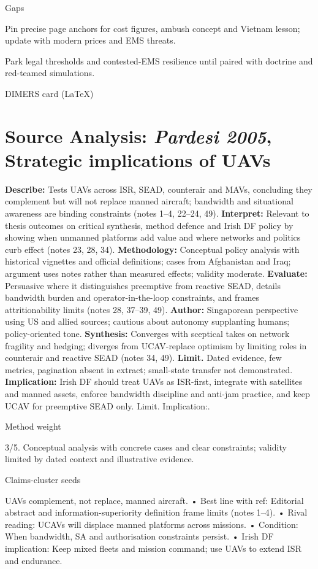 Gaps

Pin precise page anchors for cost figures, ambush concept and Vietnam lesson; update with modern prices and EMS threats.

Park legal thresholds and contested-EMS resilience until paired with doctrine and red-teamed simulations.

\parencite{PARDESI_2005}
DIMERS card (LaTeX)

\section*{Source Analysis: \textit{Pardesi 2005}, Strategic implications of UAVs}
\textbf{Describe:} Tests UAVs across ISR, SEAD, counterair and MAVs, concluding they complement but will not replace manned aircraft; bandwidth and situational awareness are binding constraints (notes 1–4, 22–24, 49).
\textbf{Interpret:} Relevant to thesis outcomes on critical synthesis, method defence and Irish DF policy by showing when unmanned platforms add value and where networks and politics curb effect (notes 23, 28, 34).
\textbf{Methodology:} Conceptual policy analysis with historical vignettes and official definitions; cases from Afghanistan and Iraq; argument uses notes rather than measured effects; validity moderate.
\textbf{Evaluate:} Persuasive where it distinguishes preemptive from reactive SEAD, details bandwidth burden and operator-in-the-loop constraints, and frames attritionability limits (notes 28, 37–39, 49).
\textbf{Author:} Singaporean perspective using US and allied sources; cautious about autonomy supplanting humans; policy-oriented tone.
\textbf{Synthesis:} Converges with sceptical takes on network fragility and hedging; diverges from UCAV-replace optimism by limiting roles in counterair and reactive SEAD (notes 34, 49).
\textbf{Limit.} Dated evidence, few metrics, pagination absent in extract; small-state transfer not demonstrated.
\textbf{Implication:} Irish DF should treat UAVs as ISR-first, integrate with satellites and manned assets, enforce bandwidth discipline and anti-jam practice, and keep UCAV for preemptive SEAD only. Limit. Implication:.

Method weight

3/5. Conceptual analysis with concrete cases and clear constraints; validity limited by dated context and illustrative evidence.

Claims-cluster seeds

UAVs complement, not replace, manned aircraft.
• Best line with ref: Editorial abstract and information-superiority definition frame limits (notes 1–4).
• Rival reading: UCAVs will displace manned platforms across missions.
• Condition: When bandwidth, SA and authorisation constraints persist.
• Irish DF implication: Keep mixed fleets and mission command; use UAVs to extend ISR and endurance.


